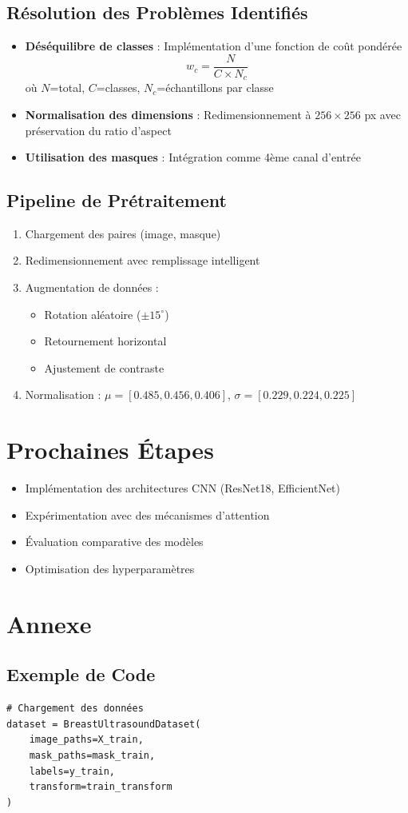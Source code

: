 \documentclass[a4paper,12pt]{article}
\begin{document}
\subsection{Résolution des Problèmes Identifiés}
\begin{itemize}
    \item \textbf{Déséquilibre de classes} : Implémentation d'une fonction de coût pondérée
    \begin{equation}
        w_c = \frac{N}{C \times N_c}
    \end{equation}
    où $N$=total, $C$=classes, $N_c$=échantillons par classe

    \item \textbf{Normalisation des dimensions} : Redimensionnement à $256\times256$ px avec préservation du ratio d'aspect

    \item \textbf{Utilisation des masques} : Intégration comme 4ème canal d'entrée
\end{itemize}

\subsection{Pipeline de Prétraitement}
\begin{enumerate}
    \item Chargement des paires (image, masque)
    \item Redimensionnement avec remplissage intelligent
    \item Augmentation de données :
    \begin{itemize}
        \item Rotation aléatoire ($\pm15^\circ$)
        \item Retournement horizontal
        \item Ajustement de contraste
    \end{itemize}
    \item Normalisation : $\mu=[0.485,0.456,0.406]$, $\sigma=[0.229,0.224,0.225]$
\end{enumerate}

\section{Prochaines Étapes}
\begin{itemize}
    \item Implémentation des architectures CNN (ResNet18, EfficientNet)
    \item Expérimentation avec des mécanismes d'attention
    \item Évaluation comparative des modèles
    \item Optimisation des hyperparamètres
\end{itemize}

\section*{Annexe}
\subsection*{Exemple de Code}
\begin{verbatim}
# Chargement des données
dataset = BreastUltrasoundDataset(
    image_paths=X_train,
    mask_paths=mask_train,
    labels=y_train,
    transform=train_transform
)
\end{verbatim}
\end{document}
